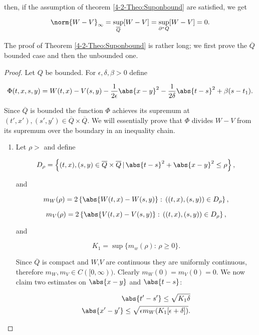 then, if the assumption of theorem \ref{4-2-Theo:Suponbound} are satisfied, we get

\[\norm{W-V}_{\infty} = \sup_{\overline{Q}}[W-V]=\sup_{\partial^{\ast}Q}[W-V] = 0.\]

The proof of Theorem \ref{4-2-Theo:Suponbound} is rather long; we first prove the $\overline{Q}$ bounded case and then the unbounded one.

\begin{proof}
    
    Let $Q$ be bounded. For $\epsilon, \delta, \beta >0$ define
    
    \begin{equation}\label{4-2-InProofSup:phi}
        \Phi(t,x,s,y) = W(t,x) - V(s,y) - \frac{1}{2\epsilon} \abs{x-y}^2 -\frac{1}{2\delta} \abs{t-s}^2 + \beta(s-t_1).   
    \end{equation}

    Since $\overline{Q}$ is bounded the function $\Phi$ achieves its supremum at $(t',x'),(s',y')\in\overline{Q}\times\overline{Q}$. We will essentially prove 
    that $\Phi$ divides $W-V$ from its supremum over the boundary in an inequality chain.
    
    \begin{enumerate}
        \item Let $\rho>$ and define
        
        \begin{equation}\label{4-2-InProofSup:Drho}
            D_{\rho} = \left\{(t,x),(s,y)\in\overline{Q}\times\overline{Q}\,|\,\abs{t-s}^2+\abs{x-y}^2\leq\rho\right\},
        \end{equation}

        and 

        \[m_W(\rho)=2\left\{\abs{W(t,x)-W(s,y)}:\,((t,x),(s,y))\in D_{\rho}\right\},\]

        \[m_V(\rho)=2\left\{\abs{V(t,x)-V(s,y)}:\,((t,x),(s,y))\in D_{\rho}\right\},\]

        and 

        \[K_1 = \sup\{m_w(\rho):\,\rho\geq0\}.\]

        Since $\overline{Q}$ is compact and $W$,$V$ are continuous they are uniformly continuous, therefore $m_W,m_V\in C([0,\infty))$. Clearly 
        $m_W(0)=m_V(0)=0$. We now claim two estimates on $\abs{x-y}$ and $\abs{t-s}$:

        \begin{equation}
            \begin{aligned}
                \abs{t'-s'}\leq\sqrt{K_1\delta} \\
                \abs{x'-y'}\leq \sqrt{\epsilon m_W(K_1[\epsilon+\delta])}.
            \end{aligned}
        \end{equation}


\end{enumerate}
\end{proof}
